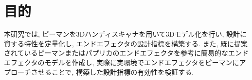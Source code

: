\section{目的}
本研究では, ピーマンを3Dハンディスキャナを用いて3Dモデル化を行い, 設計に資する特性を定量化し, エンドエフェクタの設計指標を構築する.
また, 既に提案されているピーマンまたはパプリカのエンドエフェクタを参考に簡易的なエンドエフェクタのモデルを作成し, 実際に実環境でエンドエフェクタをピーマンにアプローチさせることで, 構築した設計指標の有効性を検証する.
